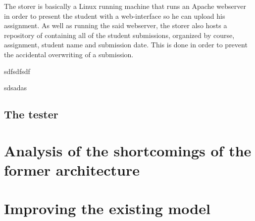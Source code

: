 The storer is basically a Linux running machine that runs an Apache webserver
in order to present the student with a web-interface so he can upload his
assignment. As well as running the said webserver, the storer also hosts a 
repository of containing all of the student submissions, organized by course,
assignment, student name and submission date. This is done in order to prevent
the accidental overwriting of a submission.

\begin{center}
\end{center}

sdfsdfsdf

\begin{center}
\end{center}

sdsadas











\subsection{The tester}
\label{sub-sec:tester}

\begin{center}
\end{center}


\section{Analysis of the shortcomings of the former architecture}
\label{sec:vmc-analysis}


\section{Improving the existing model}
\label{sec:vmc-improving}


